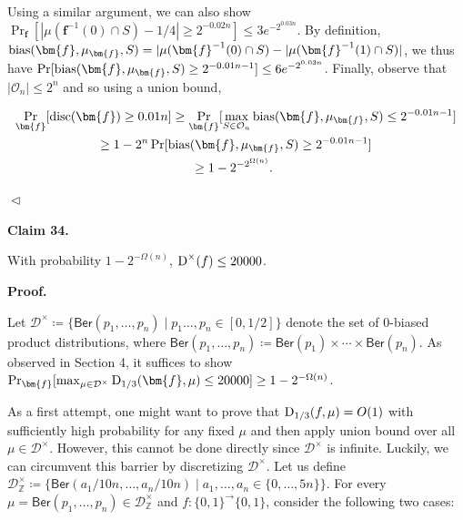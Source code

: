 \documentclass[10pt,a4paper]{article}
\begin{document}
Using a similar argument, we can also show $\Pr_{\bm{f}}[|\mu(\bm{f}^{-1}(0)\cap S)-1/4|\geq 2^{-0.02n}]\leq 3e^{-2^{0.03n}}$.
By definition, ${\textup{bias}}(\bm{f},\mu_{\bm{f}},S)=|\mu(\bm{f}^{-1}(0)\cap S)-|\mu(\bm{f}^{-1}(1)\cap S)|$, we thus have $\Pr[{\textup{bias}}(\bm{f},\mu_{\bm{f}},S)\geq 2^{-0.01n-1}]\leq 6e^{-2^{0.03n}}$. Finally, observe that $|\mathcal{O}_{n}|\leq 2^{n}$ and so using a union bound,\par


\[\begin{gathered}
\displaystyle\Pr_{\bm{f}}[{\textup{disc}}(\bm{f})\geq 0.01n] \displaystyle\geq\Pr_{\bm{f}}[\max_{S\in\mathcal{O}_{n}}{\textup{bias}}(\bm{f},\mu_{\bm{f}},S)\leq 2^{-0.01n-1}] \\
\displaystyle\geq 1-2^{n}\Pr[{\textup{bias}}(\bm{f},\mu_{\bm{f}},S)\geq 2^{-0.01n-1}] \\
\displaystyle\geq 1-2^{-2^{\Omega(n)}}.\
\end{gathered}\]


$\vartriangleleft$\par





\par\medskip\noindent\textbf{
Claim 34. 
}\par



With probability $1-2^{-\Omega(n)}$, ${\textup{D}}^{\times}(f)\leq 20000$.\par







\par\medskip\noindent\textbf{
\textbf{Proof}.}\par




Let $\mathcal{D}^{\times}\coloneqq\{\mathsf{Ber}(p_{1},\ldots,p_{n})\mid p_{1}\ldots,p_{n}\in[0,1/2]\}$ denote the set of $0$-biased product distributions, where $\mathsf{Ber}(p_{1},\ldots,p_{n})\coloneqq\mathsf{Ber}(p_{1})\times\cdots\times\mathsf{Ber}(p_{n})$.
As observed in Section 4, it suffices to show $\Pr_{\bm{f}}[\max_{\mu\in\mathcal{D}^{\times}}{\textup{D}}_{1/3}(\bm{f},\mu)\leq 20000]\geq 1-2^{-\Omega(n)}$.\par




As a first attempt, one might want to prove that ${\textup{D}}_{1/3}(f,\mu)=O(1)$ with sufficiently high probability for any fixed $\mu$ and then apply union bound over all $\mu\in\mathcal{D}^{\times}$.
However, this cannot be done directly since $\mathcal{D}^{\times}$ is infinite.
Luckily, we can circumvent this barrier by discretizing $\mathcal{D}^{\times}$. Let us define $\mathcal{D}^{\times}_{\mathbb{Z}}\coloneqq\{\mathsf{Ber}(a_{1}/10n,\ldots,a_{n}/10n)\mid a_{1},\ldots,a_{n}\in\{0,\ldots,5n\}\}$. For every $\mu=\mathsf{Ber}(p_{1},\ldots,p_{n})\in\mathcal{D}^{\times}_{\mathbb{Z}}$ and $f:\{0,1\}^{\to}\{0,1\}$, consider the following two cases:\par
\end{document}
